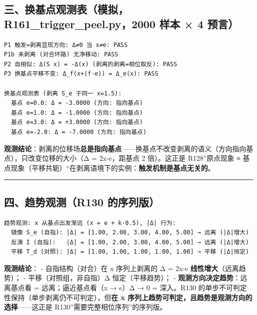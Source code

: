\documentclass[
]{article}
\begin{document}
\subsection{三、换基点观测表（模拟，R161\_trigger\_peel.py，2000 样本 ×
4
预言）}\label{ux4e09ux6362ux57faux70b9ux89c2ux6d4bux8868ux6a21ux62dfr161_trigger_peel.py2000-ux6837ux672c-4-ux9884ux8a00}

\begin{verbatim}
P1 触发=剥离显现方向: Δ≠0 当 x≠e: PASS
P1b 未剥离 (对合环路) 无净移动: PASS
P2 自相似: Δ(S x) = -Δ(x) (剥离的剥离=相位取反): PASS
P3 换基点平移不变: Δ_f(x+(f-e)) = Δ_e(x): PASS

换基点观测表 (剥离 S_e 于同一 x=1.5):
  基点 e=0.0: Δ = -3.0000 (方向: 指向基点)
  基点 e=1.0: Δ = -1.0000 (方向: 指向基点)
  基点 e=3.0: Δ = +3.0000 (方向: 指向基点)
  基点 e=-2.0: Δ = -7.0000 (方向: 指向基点)
\end{verbatim}

\textbf{观测结论}：剥离的位移场\textbf{总是指向基点}------换基点不改变剥离的语义（方向指向基点），只改变位移的大小（\textbar Δ\textbar{}
= 2\textbar x-e\textbar，距基点 2 倍）。这正是 R128''原点现象 ≡
基点现象（平移共轭）``在剥离语境下的实例：\textbf{触发机制是基点无关的}。

\begin{center}\rule{0.5\linewidth}{0.5pt}\end{center}

\subsection{四、趋势观测（R130
的序列版）}\label{ux56dbux8d8bux52bfux89c2ux6d4br130-ux7684ux5e8fux5217ux7248}

\begin{verbatim}
趋势观测: x 从基点出发渐远 (x = e + k·0.5), |Δ| 行为:
  镜像 S_e (自指): |Δ| = [1.00, 2.00, 3.00, 4.00, 5.00] → 远离 (|Δ|增大)
  反演 I (自指):   |Δ| = [1.00, 2.00, 3.00, 4.00, 5.00] → 远离 (|Δ|增大)
  平移 T_d (对照): |Δ| = [1.00, 1.00, 1.00, 1.00, 1.00] → 平移 (|Δ|恒定)
\end{verbatim}

\textbf{观测结论}： - 自指结构（对合）在 x 序列上剥离的
\textbar Δ\textbar{} = 2\textbar x-e\textbar{}
\textbf{线性增大}（远离趋势）； -
平移（对照组，非自指）\textbar Δ\textbar{} 恒定（平移趋势）； -
\textbf{观测方向决定趋势}：远离基点看 = 远离；逼近基点看（x →
e）\textbar Δ\textbar{} → 0 = 深入。R130
的单步不可判定性保持（单步剥离仍不可判定），但\textbf{在 x
序列上趋势可判定，且趋势是观测方向的选择}------这正是
R130''需要完整相位序列''的序列版。
\end{document}
